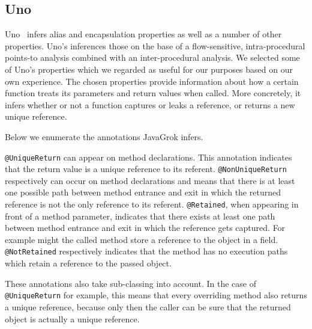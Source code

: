 

\subsection{Uno}

Uno~\cite{Uno} infers alias and encapsulation properties as well as a number
of other properties. Uno's inferences those on the base of a flow-sensitive,
intra-procedural points-to analysis combined with an inter-procedural analysis.
We selected some of Uno's properties which we regarded as useful for our
purposes based on our own experience. The chosen properties 
provide information about how a certain function treats its parameters and 
return values when called. More concretely, it infers whether or not a 
function captures or leaks a reference, or returns a new unique reference.

Below we enumerate the annotations JavaGrok infers.

\texttt{@UniqueReturn} can appear on method declarations. This annotation 
indicates that the return value is a unique reference to its referent.
\texttt{@NonUniqueReturn} respectively can occur on method declarations and means 
that there is at least one possible path between method entrance and exit in
which the returned reference is not the only reference to its referent.
\texttt{@Retained}, when appearing in front of a method parameter, indicates
that there exists at least one path between method entrance and exit in 
which the reference gets captured. For example might the called method store
a reference to the object in a field.
\texttt{@NotRetained} respectively indicates that the method has no execution 
paths which retain a reference to the passed object.

These annotations also take sub-classing into account. In the case of
\texttt{@UniqueReturn} for example, this means that every overriding method
also returns a unique reference, because only then the caller can be sure
that the returned object is actually a unique reference.

